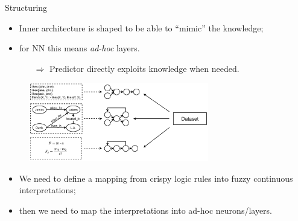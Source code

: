\documentclass[presentation]{beamer}\mode<presentation>{\usetheme{AMSBolognaFC}}
\begin{document}
\begin{frame}[allowframebreaks]{Structuring}
    \begin{itemize}
        \item Inner architecture is shaped to be able to ``mimic'' the knowledge;
        \item for NN this means \emph{ad-hoc} layers.
        \begin{itemize}
            \item[$\Rightarrow$] Predictor directly exploits knowledge when needed.
        \end{itemize} 
    \end{itemize}
    \begin{figure}
        \centering
        \includegraphics[width=0.7\textwidth]{figures/ski-structuring}
    \end{figure}
    
    \framebreak
    
   \begin{itemize}
       \item We need to define a mapping from crispy logic rules into fuzzy continuous interpretations;
       \item then we need to map the interpretations into ad-hoc neurons/layers.
   \end{itemize}   

    \framebreak
    

\end{frame}
\end{document}

